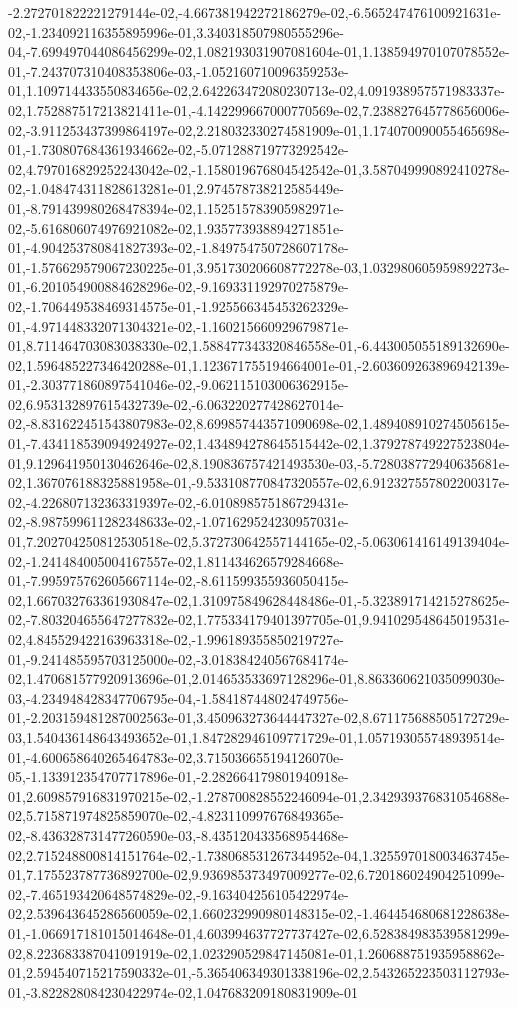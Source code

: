-2.272701822221279144e-02,-4.667381942272186279e-02,-6.565247476100921631e-02,-1.234092116355895996e-01,3.340318507980555296e-04,-7.699497044086456299e-02,1.082193031907081604e-01,1.138594970107078552e-01,-7.243707310408353806e-03,-1.052160710096359253e-01,1.109714433550834656e-02,2.642263472080230713e-02,4.091938957571983337e-02,1.752887517213821411e-01,-4.142299667000770569e-02,7.238827645778656006e-02,-3.911253437399864197e-02,2.218032330274581909e-01,1.174070090055465698e-01,-1.730807684361934662e-02,-5.071288719773292542e-02,4.797016829252243042e-02,-1.158019676804542542e-01,3.587049990892410278e-02,-1.048474311828613281e-01,2.974578738212585449e-01,-8.791439980268478394e-02,1.152515783905982971e-02,-5.616806074976921082e-02,1.935773938894271851e-01,-4.904253780841827393e-02,-1.849754750728607178e-01,-1.576629579067230225e-01,3.951730206608772278e-03,1.032980605959892273e-01,-6.201054900884628296e-02,-9.169331192970275879e-02,-1.706449538469314575e-01,-1.925566345453262329e-01,-4.971448332071304321e-02,-1.160215660929679871e-01,8.711464703083038330e-02,1.588477343320846558e-01,-6.443005055189132690e-02,1.596485227346420288e-01,1.123671755194664001e-01,-2.603609263896942139e-01,-2.303771860897541046e-02,-9.062115103006362915e-02,6.953132897615432739e-02,-6.063220277428627014e-02,-8.831622451543807983e-02,8.699857443571090698e-02,1.489408910274505615e-01,-7.434118539094924927e-02,1.434894278645515442e-02,1.379278749227523804e-01,9.129641950130462646e-02,8.190836757421493530e-03,-5.728038772940635681e-02,1.367076188325881958e-01,-9.533108770847320557e-02,6.912327557802200317e-02,-4.226807132363319397e-02,-6.010898575186729431e-02,-8.987599611282348633e-02,-1.071629524230957031e-01,7.202704250812530518e-02,5.372730642557144165e-02,-5.063061416149139404e-02,-1.241484005004167557e-02,1.811434626579284668e-01,-7.995975762605667114e-02,-8.611599355936050415e-02,1.667032763361930847e-02,1.310975849628448486e-01,-5.323891714215278625e-02,-7.803204655647277832e-02,1.775334179401397705e-01,9.941029548645019531e-02,4.845529422163963318e-02,-1.996189355850219727e-01,-9.241485595703125000e-02,-3.018384240567684174e-02,1.470681577920913696e-01,2.014653533697128296e-01,8.863360621035099030e-03,-4.234948428347706795e-04,-1.584187448024749756e-01,-2.203159481287002563e-01,3.450963273644447327e-02,8.671175688505172729e-03,1.540436148643493652e-01,1.847282946109771729e-01,1.057193055748939514e-01,-4.600658640265464783e-02,3.715036655194126070e-05,-1.133912354707717896e-01,-2.282664179801940918e-01,2.609857916831970215e-02,-1.278700828552246094e-01,2.342939376831054688e-02,5.715871974825859070e-02,-4.823110997676849365e-02,-8.436328731477260590e-03,-8.435120433568954468e-02,2.715248800814151764e-02,-1.738068531267344952e-04,1.325597018003463745e-01,7.175523787736892700e-02,9.936985373497009277e-02,6.720186024904251099e-02,-7.465193420648574829e-02,-9.163404256105422974e-02,2.539643645286560059e-02,1.660232990980148315e-02,-1.464454680681228638e-01,-1.066917181015014648e-01,4.603994637727737427e-02,6.528384983539581299e-02,8.223683387041091919e-02,1.023290529847145081e-01,1.260688751935958862e-01,2.594540715217590332e-01,-5.365406349301338196e-02,2.543265223503112793e-01,-3.822828084230422974e-02,1.047683209180831909e-01

